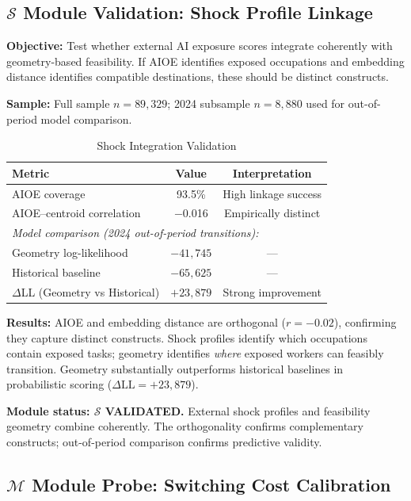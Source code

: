 \documentclass[12pt]{article}
\begin{document}
\subsection{$\mathcal{S}$ Module Validation: Shock Profile Linkage}
\label{subsec:shock-integration}


\textbf{Objective:} Test whether external AI exposure scores integrate coherently with geometry-based feasibility. If AIOE identifies exposed occupations and embedding distance identifies compatible destinations, these should be distinct constructs.

\textbf{Sample:} Full sample $n = 89{,}329$; 2024 subsample $n = 8{,}880$ used for out-of-period model comparison.


\begin{table}[h!]
\centering
\caption{Shock Integration Validation}
\label{tab:shock-integration}
\begin{tabular}{lcc}
\toprule
\textbf{Metric} & \textbf{Value} & \textbf{Interpretation} \\
\midrule
AIOE coverage & 93.5\% & High linkage success \\
AIOE--centroid correlation & $-$0.016 & Empirically distinct \\
\midrule
\multicolumn{3}{l}{\textit{Model comparison (2024 out-of-period transitions):}} \\
Geometry log-likelihood & $-41{,}745$ & --- \\
Historical baseline & $-65{,}625$ & --- \\
$\Delta$LL (Geometry vs Historical) & $+23{,}879$ & Strong improvement \\
\bottomrule
\end{tabular}
\end{table}


\textbf{Results:} AIOE and embedding distance are orthogonal ($r = -0.02$), confirming they capture distinct constructs. Shock profiles identify which occupations contain exposed tasks; geometry identifies \emph{where} exposed workers can feasibly transition. Geometry substantially outperforms historical baselines in probabilistic scoring ($\Delta \text{LL} = +23{,}879$).

\textbf{Module status: $\mathcal{S}$ VALIDATED.} External shock profiles and feasibility geometry combine coherently. The orthogonality confirms complementary constructs; out-of-period comparison confirms predictive validity.


\subsection{$\mathcal{M}$ Module Probe: Switching Cost Calibration}
\label{subsec:cost-calibration}
\end{document}
